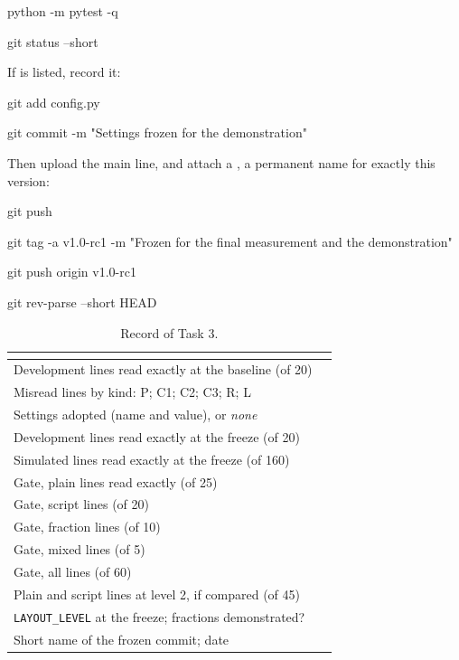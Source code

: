 \label{st:freeze}
\begin{ps}
python -m pytest -q
\end{ps}
\begin{ps}
git status --short
\end{ps}
If  is listed, record it:
\begin{ps}
git add config.py
\end{ps}
\begin{ps}
git commit -m "Settings frozen for the demonstration"
\end{ps}
Then upload the main line, and attach a , a permanent name for exactly this version:
\begin{ps}
git push
\end{ps}
\begin{ps}
git tag -a v1.0-rc1 -m "Frozen for the final measurement and the demonstration"
\end{ps}
\begin{ps}
git push origin v1.0-rc1
\end{ps}
\begin{ps}
git rev-parse --short HEAD
\end{ps}

\begin{table}[H]
\centering
\begin{tabular}{L{7.2cm}C{4.0cm}}
\toprule
{} &  \\
\midrule
Development lines read exactly at the baseline (of 20) & \\
Misread lines by kind: P; C1; C2; C3; R; L & \\
Settings adopted (name and value), or \emph{none} & \\
Development lines read exactly at the freeze (of 20) & \\
Simulated lines read exactly at the freeze (of 160) & \\
Gate, plain lines read exactly (of 25) & \\
Gate, script lines (of 20) & \\
Gate, fraction lines (of 10) & \\
Gate, mixed lines (of 5) & \\
Gate, all lines (of 60) & \\
Plain and script lines at level 2, if compared (of 45) & \\
\texttt{LAYOUT\_LEVEL} at the freeze; fractions demonstrated? & \\
Short name of the frozen commit; date & \\
\bottomrule
\end{tabular}
\caption{Record of Task 3.}
\label{tab:t3record}
\end{table}
